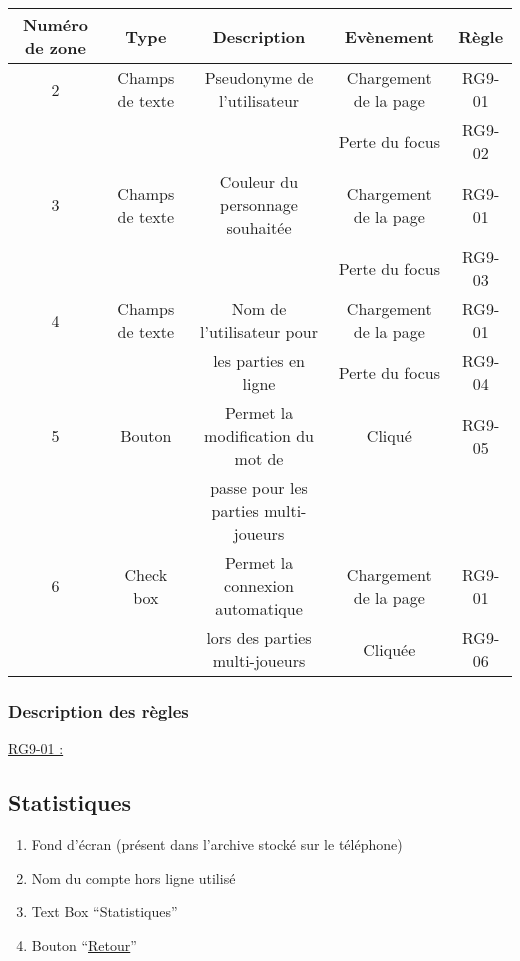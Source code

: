 \documentclass{report}
\begin{document}
			\begin{tabular}{|c|c|c|c|c|} \hline
				Numéro de zone & Type  & Description & Evènement &	Règle \\\hline
				2 & Champs de texte & Pseudonyme de l'utilisateur & Chargement de la page & RG9-01 \\
				  &                 &                             & Perte du focus & RG9-02 \\\hline
				3 & Champs de texte & Couleur du personnage souhaitée & Chargement de la page & RG9-01 \\
				  &                 &                             & Perte du focus & RG9-03 \\\hline
				4 & Champs de texte & Nom de l'utilisateur pour & Chargement de la page & RG9-01 \\
				  &                 & les parties en ligne      & Perte du focus & RG9-04 \\\hline
				5 & Bouton & Permet la modification du mot de & Cliqué & RG9-05 \\
				  &        & passe pour les parties multi-joueurs & & \\\hline
				6 & Check box & Permet la connexion automatique & Chargement de la page & RG9-01 \\
				  &           & lors des parties multi-joueurs            & Cliquée               & RG9-06 \\\hline
			\end{tabular}
			
		\subsubsection{Description des règles}

			\underline{RG9-01 :}
				\begin{quote}
				
				\end{quote}
	
\newpage

	\subsection{Statistiques}
		
		\hypertarget{Statistiques}{}
		\label{Statistiques}
			
		\begin{center}
			
		\end{center}
		
		\begin{enumerate}
		  \item Fond d'écran (présent dans l'archive stocké sur le téléphone)
		  \item Nom du compte hors ligne utilisé
		  \item Text Box ``Statistiques''
		  \item Bouton ``\hyperlink{Accueil}{Retour}''
		\end{enumerate}
\end{document}
